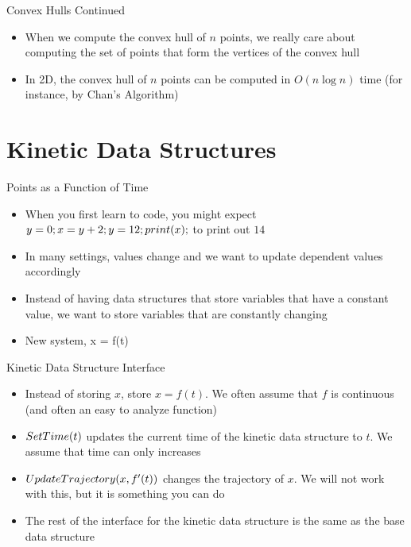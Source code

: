 \documentclass[aspectratio=169, handout]{beamer}
\begin{document}
\begin{frame}{Convex Hulls Continued}
    \begin{itemize}
        \item When we compute the convex hull of $n$ points, we really care about computing the set of points that form the vertices of the convex hull
        \item In 2D, the convex hull of $n$ points can be computed in $O(n \log n)$ time (for instance, by Chan's Algorithm)
    \end{itemize}
\end{frame}

\section{Kinetic Data Structures}
\frame{\sectionpage}

\begin{frame}{Points as a Function of Time}
    \begin{itemize}
        \item When you first learn to code, you might expect $y = 0; x = y + 2; y = 12; \emph{print}(x);$ to print out $14$
        \item In many settings, values change and we want to update dependent values accordingly
        \item Instead of having data structures that store variables that have a constant value, we want to store variables that are constantly changing
        \pause
        \item New system, x = f(t)
    \end{itemize}
\end{frame}

\begin{frame}{Kinetic Data Structure Interface}
    \begin{itemize}
        \item Instead of storing $x$, store $x = f(t)$. We often assume that $f$ is continuous (and often an easy to analyze function)
        \pause
        \item $\emph{SetTime}(t)$ updates the current time of the kinetic data structure to $t$. We assume that time can only increases
        \item $\emph{UpdateTrajectory}(x, f'(t))$ changes the trajectory of $x$. We will not work with this, but it is something you can do
        \pause
        \item The rest of the interface for the kinetic data structure is the same as the base data structure
    \end{itemize}
\end{frame}
\end{document}
